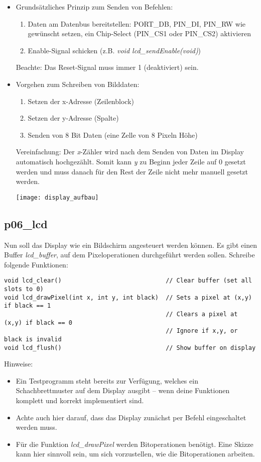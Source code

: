 \documentclass[
  accentcolor=tud1c,	%
  colorbacktitle,		%
  inverttitle,			%
  german,				%
  twoside
]{tudexercise}
\begin{document}
\begin{itemize}
\item
Grundsätzliches Prinzip zum Senden von Befehlen:
\begin{enumerate}
	\item
	Daten am Datenbus bereitstellen: PORT\_DB, PIN\_DI, PIN\_RW wie gewünscht setzen, ein Chip-Select (PIN\_CS1 oder PIN\_CS2) aktivieren
	
	\item
	Enable-Signal schicken (z.B. \textit{void lcd\_sendEnable(void)})
\end{enumerate}
Beachte: Das Reset-Signal muss immer 1 (deaktiviert) sein.

\item Vorgehen zum Schreiben von Bilddaten:
\begin{enumerate}
	\item Setzen der x-Adresse (Zeilenblock)
	\item Setzen der y-Adresse (Spalte)
	\item Senden von 8 Bit Daten (eine \glqq{}Zelle\grqq{} von 8 Pixeln Höhe)
\end{enumerate}
Vereinfachung: Der \textit{x}-Zähler wird nach dem Senden von Daten im Display automatisch hochgezählt.
Somit kann \textit{y} zu Beginn jeder Zeile auf 0 gesetzt werden und muss danach für den Rest der Zeile nicht mehr manuell gesetzt werden.

\begin{center}\texttt{[image: display\_aufbau]}\end{center}


\end{itemize}

\subsection{p06\_lcd}
Nun soll das Display wie ein Bildschirm angesteuert werden können. Es gibt einen Buffer \textit{lcd\_buffer}, auf dem Pixeloperationen durchgeführt werden sollen. 
Schreibe folgende Funktionen:
\begin{lstlisting}
void lcd_clear()                             // Clear buffer (set all slots to 0)
void lcd_drawPixel(int x, int y, int black)  // Sets a pixel at (x,y) if black == 1
                                             // Clears a pixel at (x,y) if black == 0
                                             // Ignore if x,y, or black is invalid
void lcd_flush()                             // Show buffer on display
\end{lstlisting}
Hinweise:
\begin{itemize}
\item 
Ein Testprogramm steht bereits zur Verfügung, welches ein Schachbrettmuster auf dem Display ausgibt -- wenn deine Funktionen komplett und korrekt implementiert sind.

\item
Achte auch hier darauf, dass das Display zunächst per Befehl eingeschaltet werden muss.

\item
Für die Funktion \textit{lcd\_drawPixel} werden Bitoperationen benötigt. Eine Skizze kann hier sinnvoll sein, um sich vorzustellen, wie die Bitoperationen arbeiten.
\end{itemize}
\end{document}
